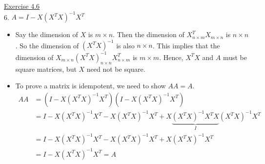 \underline{Exercise 4.6}  \\

6. \( A=I-X\left(X^T X\right)^{-1} X^T \) 

\begin{itemize}

\item[(a.)] Say the dimension of $X$ is \( m \times n \). Then the dimension of \( X_{n \times m}^T X_{m \times n} \) is \( n \times n \). So the dimension of \( \left(X^T X\right)^{-1} \) is also  \( n \times n \).  This implies that the dimension of \( X_{m \times n}\left(X^T X\right)_{n \times n}^{-1} X_{n \times m}^T \) is \( m \times m \). Hence, \( X^T X \) and $A$ must be square matrices, but $X$ need not be square.

\item[(b.)] To prove a matrix is idempotent, we need to show $AA=A$.
\[
\begin{aligned}
A A &= (I-X\left(X^T X\right)^{-1} X^T)(I-X\left(X^T X\right)^{-1} X^T) \\
& = I-X\left(X^T X\right)^{-1} X^T-X\left(X^T X\right)^{-1} X^T+X\underbrace{\left(X^T X\right)^{-1} X^T X}_{I}\left(X^T X\right)^{-1} X^T \\
&= I-X\left(X^T X\right)^{-1} X^T-X\left(X^T X\right)^{-1} X^T+X\left(X^T X\right)^{-1} X^T \\ 
&=I-X\left(X^T X\right)^{-1} X^T = A
\end{aligned}
\]
\end{itemize}
